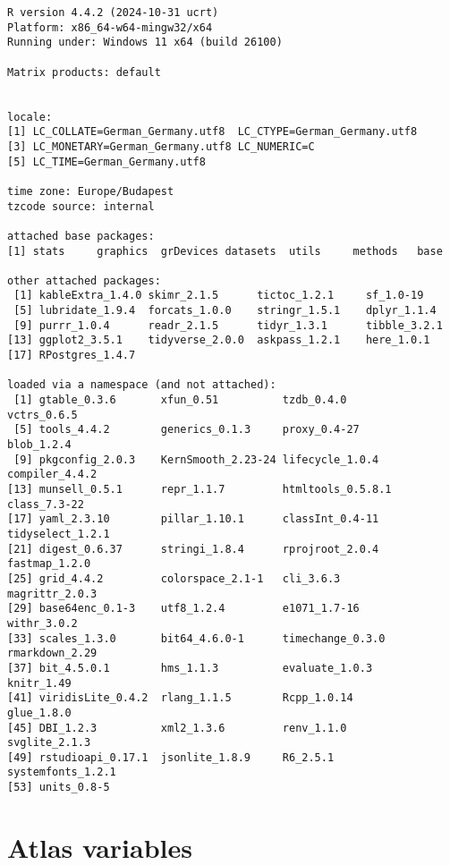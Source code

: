 \documentclass[
  letterpaper,
  DIV=11,
  numbers=noendperiod]{scrreprt}
\begin{document}
\begin{verbatim}
R version 4.4.2 (2024-10-31 ucrt)
Platform: x86_64-w64-mingw32/x64
Running under: Windows 11 x64 (build 26100)

Matrix products: default


locale:
[1] LC_COLLATE=German_Germany.utf8  LC_CTYPE=German_Germany.utf8
[3] LC_MONETARY=German_Germany.utf8 LC_NUMERIC=C
[5] LC_TIME=German_Germany.utf8

time zone: Europe/Budapest
tzcode source: internal

attached base packages:
[1] stats     graphics  grDevices datasets  utils     methods   base

other attached packages:
 [1] kableExtra_1.4.0 skimr_2.1.5      tictoc_1.2.1     sf_1.0-19
 [5] lubridate_1.9.4  forcats_1.0.0    stringr_1.5.1    dplyr_1.1.4
 [9] purrr_1.0.4      readr_2.1.5      tidyr_1.3.1      tibble_3.2.1
[13] ggplot2_3.5.1    tidyverse_2.0.0  askpass_1.2.1    here_1.0.1
[17] RPostgres_1.4.7

loaded via a namespace (and not attached):
 [1] gtable_0.3.6       xfun_0.51          tzdb_0.4.0         vctrs_0.6.5
 [5] tools_4.4.2        generics_0.1.3     proxy_0.4-27       blob_1.2.4
 [9] pkgconfig_2.0.3    KernSmooth_2.23-24 lifecycle_1.0.4    compiler_4.4.2
[13] munsell_0.5.1      repr_1.1.7         htmltools_0.5.8.1  class_7.3-22
[17] yaml_2.3.10        pillar_1.10.1      classInt_0.4-11    tidyselect_1.2.1
[21] digest_0.6.37      stringi_1.8.4      rprojroot_2.0.4    fastmap_1.2.0
[25] grid_4.4.2         colorspace_2.1-1   cli_3.6.3          magrittr_2.0.3
[29] base64enc_0.1-3    utf8_1.2.4         e1071_1.7-16       withr_3.0.2
[33] scales_1.3.0       bit64_4.6.0-1      timechange_0.3.0   rmarkdown_2.29
[37] bit_4.5.0.1        hms_1.1.3          evaluate_1.0.3     knitr_1.49
[41] viridisLite_0.4.2  rlang_1.1.5        Rcpp_1.0.14        glue_1.8.0
[45] DBI_1.2.3          xml2_1.3.6         renv_1.1.0         svglite_2.1.3
[49] rstudioapi_0.17.1  jsonlite_1.8.9     R6_2.5.1           systemfonts_1.2.1
[53] units_0.8-5
\end{verbatim}


\hypertarget{atlas-variables}{%
\chapter{Atlas variables}\label{atlas-variables}}

\end{document}
